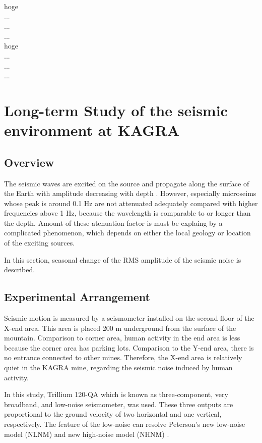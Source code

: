 hoge\\
...\\
...\\
...\\

hoge\\
...\\
...\\
...\\


\newpage
\section{Long-term Study of the seismic environment at KAGRA}
\subsection{Overview}
The seismic waves are excited on the source and propagate along the surface of the Earth with amplitude decreasing with depth \cite{carter1991high}. However, especially microseims whose peak is around 0.1 $\mathrm{Hz}$ are not attenuated adequately compared with higher frequencies above 1 $\mathrm{Hz}$, because the wavelength is comparable to or longer than the depth. Amount of these atenuation factor is must be explaing by a complicated phenomenon, which depends on either the local geology or location of the exciting sources. 

In this section, seasonal change of the RMS amplitude of the seismic noise is described.


\subsection{Experimental Arrangement}
Seismic motion is measured by a seismometer installed on the second floor of the X-end area. This area is placed 200 $\mathrm{m}$ underground from the surface of the mountain. Comparison to corner area, human activity in the end area is less because the corner area has parking lots. Comparison to the Y-end area, there is no entrance connected to other mines. Therefore, the X-end area is relatively quiet in the KAGRA mine, regarding the seismic noise induced by human activity.

In this study, Trillium 120-QA which is known as three-component, very broadband, and low-noise seismometer, was used. These three outputs are proportional to the ground velocity of two horizontal and one vertical, respectively. The feature of the low-noise can resolve  Peterson's new low-noise model (NLNM) and new high-noise model (NHNM) \cite{peterson1993observations}.

